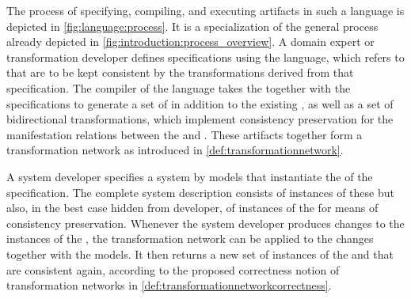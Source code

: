 The process of specifying, compiling, and executing artifacts in such a language is depicted in \autoref{fig:language:process}.
It is a specialization of the general process already depicted in \autoref{fig:introduction:process_overview}.
A domain expert or transformation developer defines \commonalities specifications using the language, which refers to \concretemetamodels that are to be kept consistent by the transformations derived from that specification.
The compiler of the language takes the \concretemetamodels together with the specifications to generate a set of \conceptmetamodels in addition to the existing \concretemetamodels, as well as a set of bidirectional transformations, which implement consistency preservation for the manifestation relations between the \conceptmetamodels and \concretemetamodels.
These artifacts together form a transformation network as introduced in \autoref{def:transformationnetwork}.

A system developer specifies a system by models that instantiate the \concretemetamodels of the \commonalities specification.
The complete system description consists of instances of these \concretemetamodels but also, in the best case hidden from developer, of instances of the \conceptmetamodels for means of consistency preservation.
Whenever the system developer produces changes to the instances of the \concretemetamodels, the transformation network can be applied to the changes together with the models.
It then returns a new set of instances of the \concretemetamodel and \conceptmetamodels that are consistent again, according to the proposed correctness notion of transformation networks in \autoref{def:transformationnetworkcorrectness}.
